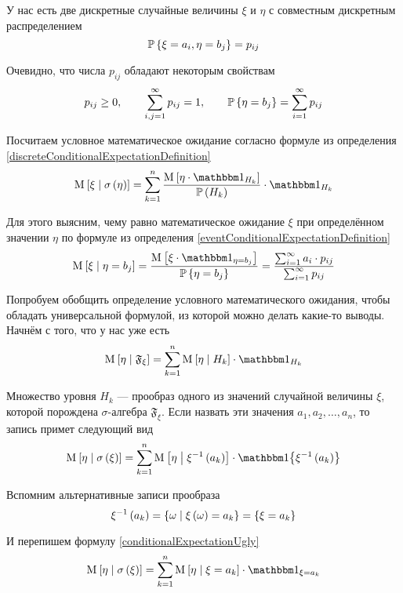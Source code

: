 \begin{example}\label{discreteConditionalExpectationExample}
    У нас есть две дискретные случайные величины $\xi$ и $\eta$
    с совместным дискретным распределением
    $$\mathbb{P}\left\{ \xi = a_i, \eta = b_j \right\} = p_{ij}$$

    Очевидно, что числа $p_{ij}$ обладают некоторым свойствам
    $$p_{ij} \ge 0, \qquad \sum_{i,j=1}^\infty p_{ij} = 1,
        \qquad \mathbb{P}\left\{ \eta = b_j \right\} = \sum_{i=1}^\infty p_{ij}$$

    Посчитаем условное математическое ожидание согласно формуле
    из определения \eqref{discreteConditionalExpectationDefinition}
    $$\Mean{\xi \mcond \sigma\left( \eta \right)} = \sum_{k=1}^n
        \frac{\Mean{\eta \cdot \indicatorof{H_k}}}{\probability{H_k}}
        \cdot \indicatorof{H_k}$$

    Для этого выясним, чему равно математическое ожидание $\xi$
    при определённом значении $\eta$ по формуле из определения
    \eqref{eventConditionalExpectationDefinition}
    $$\Mean{\xi \mcond \eta = b_j}
        = \frac{\Mean{\xi \cdot \indicatorof{\eta = b_j}}}{
            \Probability{\eta = b_j}}
        = \frac{\sum_{i=1}^{\infty} a_i \cdot p_{ij}}{
            \sum_{i=1}^{\infty} p_{ij}}$$
\end{example}

Попробуем обобщить определение условного математического ожидания,
чтобы обладать универсальной формулой, из которой можно делать какие-то выводы.
Начнём с того, что у нас уже есть
$$\Mean{ \eta \mcond \mathfrak{F}_\xi }
    = \sum_{k=1}^n \Mean{ \eta \mcond H_k } \cdot \indicatorof{H_k}$$

Множество уровня $H_k$ --- прообраз одного из значений случайной величины $\xi$,
которой порождена $\sigma$-алгебра $\mathfrak{F}_\xi$.
Если назвать эти значения $a_1, a_2, \dots, a_n$, то запись примет следующий вид
\begin{equation}\label{conditionalExpectationUgly}
    \Mean{ \eta \mcond \sigma\left( \xi \right) }
        = \sum_{k=1}^n \Mean{\eta \mcond \xi^{-1}\left( a_k \right)}
            \cdot \Indicator{\xi^{-1}\left( a_k \right)}
\end{equation}

Вспомним альтернативные записи прообраза
$$\xi^{-1}\left( a_k \right)
    = \left\{ \omega \;\middle|\; \xi\left( \omega \right) = a_k \right\}
    = \left\{ \xi = a_k \right\}$$

И перепишем формулу \eqref{conditionalExpectationUgly}
$$\Mean{ \eta \mcond \sigma\left( \xi \right) }
    = \sum_{k=1}^n \Mean{\eta \mcond \xi = a_k}
        \cdot \indicatorof{\xi = a_k}$$

